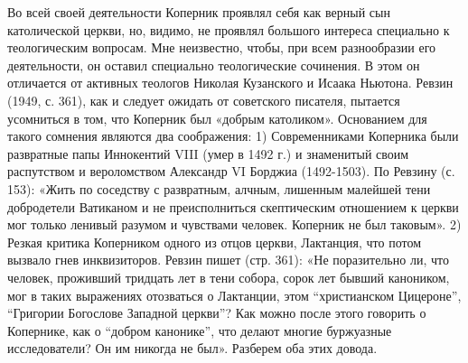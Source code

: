 Во всей своей деятельности Коперник проявлял себя как верный сын
католической церкви, но, видимо, не проявлял большого интереса
специально к теологическим вопросам. Мне неизвестно, чтобы, при всем
разнообразии его деятельности, он оставил специально теологические
сочинения. В этом он отличается от активных теологов Николая
Кузанского и Исаака Ньютона. Ревзин (1949, с. 361), как и следует
ожидать от советского писателя, пытается усомниться в том, что
Коперник был «добрым католиком». Основанием для такого сомнения
являются два соображения: 1) Современниками Коперника были развратные
папы Иннокентий VIII (умер в 1492 г.) и знаменитый своим распутством и
вероломством Александр VI Борджиа (1492-1503). По Ревзину (с. 153):
«Жить по соседству с развратным, алчным, лишенным малейшей тени
добродетели Ватиканом и не преисполниться скептическим отношением к
церкви мог только ленивый разумом и чувствами человек. Коперник не был
таковым». 2) Резкая критика Коперником одного из отцов церкви,
Лактанция, что потом вызвало гнев инквизиторов. Ревзин пишет (стр.
361): «Не поразительно ли, что человек, проживший тридцать лет в тени
собора, сорок лет бывший каноником, мог в таких выражениях отозваться
о Лактанции, этом ``христианском Цицероне'', ``Григории Богослове
Западной церкви''? Как можно после этого говорить о Копернике, как о
``добром канонике'', что делают многие буржуазные исследователи? Он им
никогда не был». Разберем оба этих довода.

